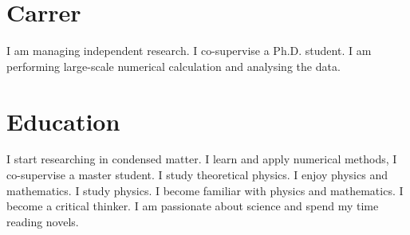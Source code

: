 \documentclass[11pt,a4paper,sans]{moderncv} %
\begin{document}
\thispagestyle{empty}

\makecvtitle %




\section{Carrer}
{I am managing independent research. I co-supervise a Ph.D. student.}
{I am performing large-scale numerical calculation and analysing the data.}
\section{Education}
{I start researching in condensed matter. I learn and apply numerical methods, I co-supervise a master student.} 
{I study theoretical physics. I enjoy physics and mathematics.}  %
{I study physics. I become familiar with physics and mathematics.}
{I become a critical thinker. I am passionate about science and spend my time reading novels.}



\end{document}
